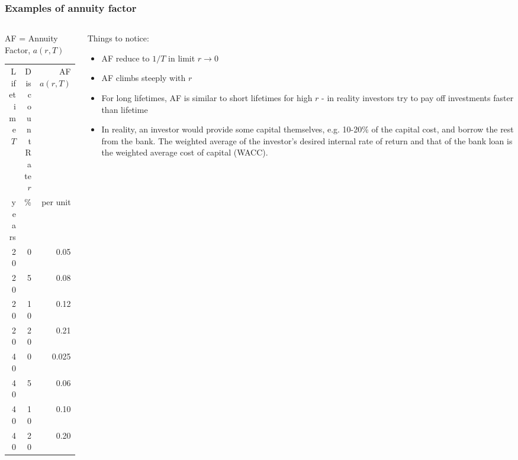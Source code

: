 \documentclass[10pt,aspectratio=169,dvipsnames]{beamer}
\let\olditem\item
\renewcommand{\item}{%
\olditem\vspace{5pt}}
\begin{document}
\begin{frame}[fragile]
  \frametitle{Examples of annuity factor}

  \begin{columns}[T]
\begin{column}{6.5cm}

  AF = Annuity Factor, $a(r,T)$
  \begin{table}[!t]
	\centering
	\begin{tabular}{@{}rrr@{}}
\toprule
Lifetime $T$  &  Discount Rate $r$ & AF $a(r,T)$ \\
years & \% & per unit \\
\midrule
20 & 0 & 0.05 \\
20 & 5 & 0.08 \\
20 & 10 & 0.12 \\
20 & 20 & 0.21 \\
40 & 0 & 0.025 \\
40 & 5 & 0.06 \\
40 & 10 & 0.10 \\
40 & 20 & 0.20 \\
\bottomrule
	\end{tabular}
\end{table}
\end{column}
\begin{column}{7.5cm}
  Things to notice:
  \begin{itemize}
  \item AF reduce to $1/T$ in limit $r \to 0$
  \item AF climbs steeply with $r$
  \item For long lifetimes, AF is similar to short lifetimes for high $r$ - in reality investors try to pay off investments faster than lifetime
  \item In reality, an investor would provide some capital themselves, e.g. 10-20\% of the capital cost, and borrow the rest from the bank. The weighted average of the investor's desired internal rate of return and that of the bank loan is the \alert{weighted average cost of capital} (WACC).
  \end{itemize}
\end{column}
  \end{columns}
\end{frame}
\end{document}
